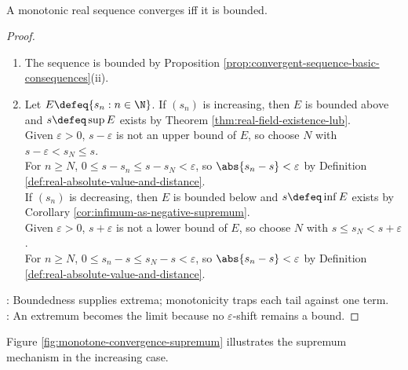\begin{theorem} \label{thm:monotone-convergence} \\
A monotonic real sequence converges iff it is bounded.
\begin{proof}
\begin{enumerate}[label=\roman*.]
\setlength{\itemsep}{0pt}
\item[$(\Rightarrow)$] The sequence is bounded by Proposition \ref{prop:convergent-sequence-basic-consequences}(ii).
\item[$(\Leftarrow)$] Let $E\defeq\{s_n:n\in\N\}$. If $(s_n)$ is increasing, then $E$ is bounded above and $s\defeq\sup E$ exists by Theorem \ref{thm:real-field-existence-lub}.\\
Given $\varepsilon>0$, $s-\varepsilon$ is not an upper bound of $E$, so choose $N$ with $s-\varepsilon<s_N\leq s$.\\
For $n\geq N$, $0\leq s-s_n\leq s-s_N<\varepsilon$, so $\abs{s_n-s}<\varepsilon$ by Definition \ref{def:real-absolute-value-and-distance}.\\
If $(s_n)$ is decreasing, then $E$ is bounded below and $s\defeq\inf E$ exists by Corollary \ref{cor:infimum-as-negative-supremum}.\\
Given $\varepsilon>0$, $s+\varepsilon$ is not a lower bound of $E$, so choose $N$ with $s\leq s_N<s+\varepsilon$.\\
For $n\geq N$, $0\leq s_n-s\leq s_N-s<\varepsilon$, so $\abs{s_n-s}<\varepsilon$ by Definition \ref{def:real-absolute-value-and-distance}.
\end{enumerate}
: Boundedness supplies extrema; monotonicity traps each tail against one term.\\
: An extremum becomes the limit because no $\varepsilon$-shift remains a bound.
\end{proof}
\end{theorem}

\begin{illustrationfigure}[H]
  \centering
  
  \caption{For an increasing bounded sequence, $s=\sup\limits_{n\in\N}s_n$ is the limit.}
  \label{fig:monotone-convergence-supremum}
\end{illustrationfigure}
Figure \ref{fig:monotone-convergence-supremum} illustrates the supremum mechanism in the increasing case.

